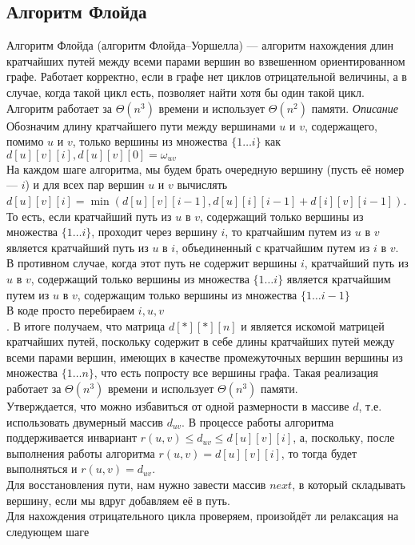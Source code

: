 \documentclass[a4paper, 12pt]{article}
\theoremstyle{plain}
\theoremstyle{definition}
\theoremstyle{remark}
\begin{document}
\subsection{Алгоритм Флойда}
Алгоритм Флойда (алгоритм Флойда–Уоршелла) — алгоритм нахождения длин кратчайших путей между всеми парами вершин во взвешенном ориентированном графе. Работает корректно, если в графе нет циклов отрицательной величины, а в случае, когда такой цикл есть, позволяет найти хотя бы один такой цикл. Алгоритм работает за $\Theta(n^3)$ времени и использует $\Theta(n^2)$ памяти.
\textit{Описание} Обозначим длину кратчайшего пути между вершинами $u$ и $v$, содержащего, помимо $u$ и $v$, только вершины из множества $\{1\dots i\}$ как $d[u][v][i], d[u][v][0]=\omega_{uv}$ \\
На каждом шаге алгоритма, мы будем брать очередную вершину (пусть её номер --- $i$) и для всех пар вершин $u$ и $v$ вычислять $d[u][v][i]=\min(d[u][v][i-1],d[u][i][i-1]+d[i][v][i-1])$. То есть, если кратчайший путь из $u$ в $v$, содержащий только вершины из множества $\{1\dots i\}$, проходит через вершину $i$, то кратчайшим путем из $u$ в $v$ является кратчайший путь из $u$ в $i$, объединенный с кратчайшим путем из $i$ в $v$. В противном случае, когда этот путь не содержит вершины $i$, кратчайший путь из $u$ в $v$, содержащий только вершины из множества $\{1\dots i\}$ является кратчайшим путем из $u$ в $v$, содержащим только вершины из множества $\{1\dots i-1\}$\\
В коде просто перебираем $i, u, v$\\.
В итоге получаем, что матрица $d[*][*][n]$ и является искомой матрицей кратчайших путей, поскольку содержит в себе длины кратчайших путей между всеми парами вершин, имеющих в качестве промежуточных вершин вершины из множества $\{1\dots n\}$, что есть попросту все вершины графа. Такая реализация работает за $\Theta(n^3)$ времени и использует $\Theta(n^3)$ памяти.\\
Утверждается, что можно избавиться от одной размерности в массиве $d$, т.е. использовать двумерный массив $d_{uv}$. В процессе работы алгоритма поддерживается инвариант $r(u,v)\leq d_{uv}\leq d[u][v][i]$, а, поскольку, после выполнения работы алгоритма $r(u,v)=d[u][v][i]$, то тогда будет выполняться и $r(u,v)=d_{uv}$.\\
Для восстановления пути, нам нужно завести массив $next$, в который складывать вершину, если мы вдруг добавляем её в путь.\\
Для нахождения отрицательного цикла проверяем, произойдёт ли релаксация на следующем шаге
\end{document}
